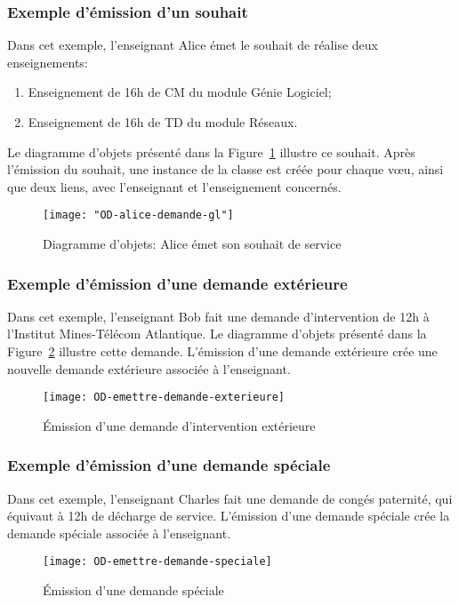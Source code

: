 \subsubsection{Exemple d'émission d'un souhait}
Dans cet exemple, l'enseignant Alice émet le souhait de réalise deux enseignements:
\begin{enumerate}
	\item Enseignement de 16h de CM du module Génie Logiciel;
	\item Enseignement de 16h de TD du module Réseaux.
\end{enumerate}
Le diagramme d'objets présenté dans la Figure~\ref{fig:souhait-alice} illustre ce souhait.
Après l'émission du souhait, une instance de la classe  est créée pour chaque vœu, ainsi que deux liens, avec l'enseignant et l'enseignement concernés. 

 \begin{figure}[!htbp]
 \begin{center}
 \texttt{[image: "OD-alice-demande-gl"]}
 \caption{Diagramme d'objets: Alice émet son souhait de service}
 \end{center}
 \label{fig:souhait-alice}
 \end{figure}


 \subsubsection{Exemple d'émission d'une demande extérieure}
Dans cet exemple, l'enseignant Bob fait une demande d'intervention de 12h à l'Institut Mines-Télécom Atlantique.
Le diagramme d'objets présenté dans la Figure~\ref{fig:demande:exterieure} illustre cette demande.
L'émission d'une demande extérieure crée une nouvelle demande extérieure associée à l'enseignant.
 
 \begin{figure}[!htbp]
 \begin{center}
 \texttt{[image: OD-emettre-demande-exterieure]}
 \caption{\'Emission d'une demande d'intervention extérieure}
 \label{fig:demande:exterieure}
 \end{center}
 \end{figure}

 \subsubsection{Exemple d'émission d'une demande spéciale}
Dans cet exemple, l'enseignant Charles fait une demande de congés paternité, qui équivaut à 12h de décharge de service.
L'émission d'une demande spéciale crée la demande spéciale associée à l'enseignant.
\begin{figure}[!htbp]
\begin{center}
\texttt{[image: OD-emettre-demande-speciale]}
\caption{\'Emission d'une demande spéciale}
\end{center}
\end{figure}




